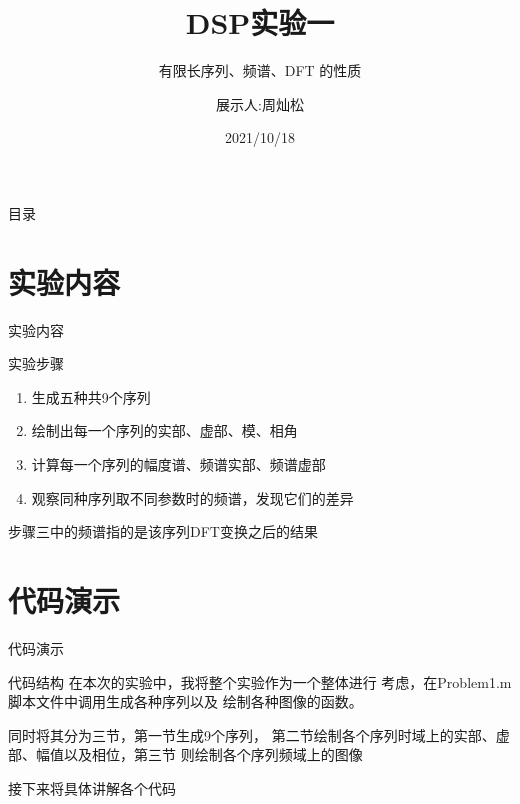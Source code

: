 \documentclass{beamer}
\title {DSP实验一}
\subtitle {有限长序列、频谱、DFT 的性质}
\author {展示人:周灿松}
\institute {信电学院} %
\date {2021/10/18}
\begin{document}
\begin{frame}
    \titlepage
\end{frame}
\begin{frame}{目录}
    \tableofcontents
\end{frame}

\section{实验内容}
\begin{frame}{实验内容}
    \begin{block}{实验步骤} 
        \begin{enumerate}
            \item 生成五种共9个序列
            \item 绘制出每一个序列的实部、虚部、模、相角
            \item 计算每一个序列的幅度谱、频谱实部、频谱虚部
            \item 观察同种序列取不同参数时的频谱，发现它们的差异
        \end{enumerate}
    \end{block}

    \hspace*{\fill} 
    
    \begin{alertblock}{}
        步骤三中的频谱指的是该序列DFT变换之后的结果
    \end{alertblock}
    
\end{frame}

\section{代码演示}
\begin{frame}{代码演示}
   \begin{block}{代码结构}
    在本次的实验中，我将整个实验作为一个整体进行
    考虑，在Problem1.m脚本文件中调用生成各种序列以及
    绘制各种图像的函数。
   \end{block}
   \begin{block}{}
    同时将其分为三节，第一节生成9个序列，
    第二节绘制各个序列时域上的实部、虚部、幅值以及相位，第三节
    则绘制各个序列频域上的图像
   \end{block}
   \hspace*{\fill} 
   \begin{alertblock}{}
    \centering
       接下来将具体讲解各个代码
   \end{alertblock}
\end{frame}
\end{document}
